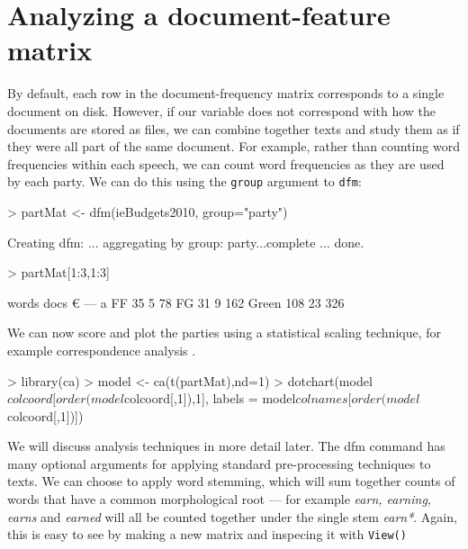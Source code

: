 \documentclass[11pt]{article}
\begin{document}
\section{Analyzing a document-feature matrix}

By default, each row in the document-frequency matrix corresponds to a single document on disk. However, if our variable does not correspond with how the documents are stored as files, we can combine together texts and study them as if they were all part of the same document. For example, rather than counting word frequencies within each speech, we can count word frequencies as they are used by each party. We can do this using the \texttt{group} argument to \texttt{dfm}:

\begin{Schunk}
\begin{Sinput}
> partMat <- dfm(ieBudgets2010, group="party")
\end{Sinput}
\begin{Soutput}
Creating dfm: ... aggregating by group: party...complete ... done. 
\end{Soutput}
\begin{Sinput}
> partMat[1:3,1:3]
\end{Sinput}
\begin{Soutput}
       words
docs      €  —   a
  FF     35  5  78
  FG     31  9 162
  Green 108 23 326
\end{Soutput}
\end{Schunk}

We can now score and plot the parties using a statistical scaling technique, for example correspondence analysis \citep{nenadic2007}. 

\begin{Schunk}
\begin{Sinput}
> library(ca)
> model <- ca(t(partMat),nd=1)
> dotchart(model$colcoord[order(model$colcoord[,1]),1], labels = model$colnames[order(model$colcoord[,1])])
\end{Sinput}
\end{Schunk}

We will discuss analysis techniques in more detail later. The dfm command has many optional arguments for applying standard pre-processing techniques to texts. We can choose to apply word stemming, which will sum together counts of words that have a common morphological root --- for example \textit{earn, earning, earns} and \textit{earned} will all be counted together under the single stem \textit{earn*}. Again, this is easy to see by making a new matrix and inspecing it with \texttt{View()}
\end{document}
